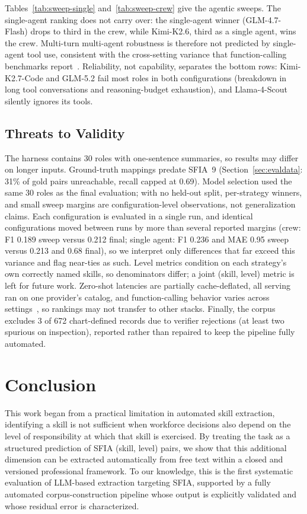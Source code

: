 \documentclass[conference]{IEEEtran}
\begin{document}
Tables~\ref{tab:sweep-single} and~\ref{tab:sweep-crew} give the agentic sweeps. The single-agent ranking does not carry over: the single-agent winner (GLM-4.7-Flash) drops to third in the crew, while Kimi-K2.6, third as a single agent, wins the crew. Multi-turn multi-agent robustness is therefore not predicted by single-agent tool use, consistent with the cross-setting variance that function-calling benchmarks report~\cite{patil2025bfcl}. Reliability, not capability, separates the bottom rows: Kimi-K2.7-Code and GLM-5.2 fail most roles in both configurations (breakdown in long tool conversations and reasoning-budget exhaustion), and Llama-4-Scout silently ignores its tools.

\subsection{Threats to Validity}\label{sec:threats}
The harness contains 30 roles with one-sentence summaries, so results may differ on longer inputs. Ground-truth mappings predate SFIA~9 (Section~\ref{sec:evaldata}: 31\% of gold pairs unreachable, recall capped at 0.69). Model selection used the same 30 roles as the final evaluation; with no held-out split, per-strategy winners, and small sweep margins are configuration-level observations, not generalization claims. Each configuration is evaluated in a single run, and identical configurations moved between runs by more than several reported margins (crew: F1 0.189 sweep versus 0.212 final; single agent: F1 0.236 and MAE 0.95 sweep versus 0.213 and 0.68 final), so we interpret only differences that far exceed this variance and flag near-ties as such. Level metrics condition on each strategy's own correctly named skills, so denominators differ; a joint (skill, level) metric is left for future work. Zero-shot latencies are partially cache-deflated, all serving ran on one provider's catalog, and function-calling behavior varies across settings~\cite{patil2025bfcl}, so rankings may not transfer to other stacks. Finally, the corpus excludes 3 of 672 chart-defined records due to verifier rejections (at least two spurious on inspection), reported rather than repaired to keep the pipeline fully automated.

\section{Conclusion}\label{sec:conclusion}

This work began from a practical limitation in automated skill extraction, identifying a skill is not sufficient when workforce decisions also depend on the level of responsibility at which that skill is exercised. By treating the task as a structured prediction of SFIA (skill, level) pairs, we show that this additional dimension can be extracted automatically from free text within a closed and versioned professional framework. To our knowledge, this is the first systematic evaluation of LLM-based extraction targeting SFIA, supported by a fully automated corpus-construction pipeline whose output is explicitly validated and whose residual error is characterized.
\end{document}

